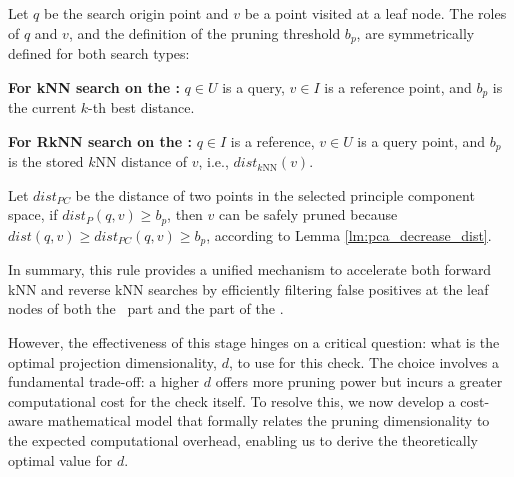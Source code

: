 \begin{lemma}
\label{lem:pointwise-pruning}
Let $q$ be the search origin point and $v$ be a point visited at a leaf node. The roles of $q$ and $v$, and the definition of the pruning threshold $b_p$, are symmetrically defined for both search types:
\begin{list}{\textbullet}
  {\setlength{\leftmargin}{1.5em}
   \setlength{\itemsep}{0pt}
   \setlength{\parsep}{0pt}
   \setlength{\topsep}{0pt}}
    \item \textbf{For kNN search on the \deltatree:} $q \in U$ is a query, $v \in I$ is a reference point, and $b_p$ is the current $k$-th best distance.
    \item \textbf{For RkNN search on the \hdrtree:} $q \in I$ is a reference, $v \in U$ is a query point, and $b_p$ is the stored $k$NN distance of $v$, i.e., $dist_{k\mathrm{NN}}(v)$.
\end{list}
Let $dist_{PC}$ be the distance of two points in the selected principle component space, if $dist_{P}(q,v) \ge b_p$, then $v$ can be safely pruned because $dist(q,v)\ge dist_{PC}(q,v)\ge b_p$, according to Lemma \ref{lm:pca_decrease_dist}.
\end{lemma}

In summary, this rule provides a unified mechanism to accelerate both forward kNN and reverse kNN searches by efficiently filtering false positives at the leaf nodes of both the \deltatree\ part and the \hdrtree part of the \dualtree. 

However, the effectiveness of this stage hinges on a critical question: what is the optimal projection dimensionality, $d$, to use for this check. The choice involves a fundamental trade-off: a higher $d$ offers more pruning power but incurs a greater computational cost for the check itself. To resolve this, we now develop a cost-aware mathematical model that formally relates the pruning dimensionality to the expected computational overhead, enabling us to derive the theoretically optimal value for $d$.



